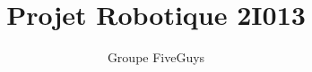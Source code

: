 \documentclass[12pt]{article}
\begin{document}
\title{Projet Robotique 2I013}
\author{Groupe FiveGuys}
\date{}
\maketitle
\end{document}
